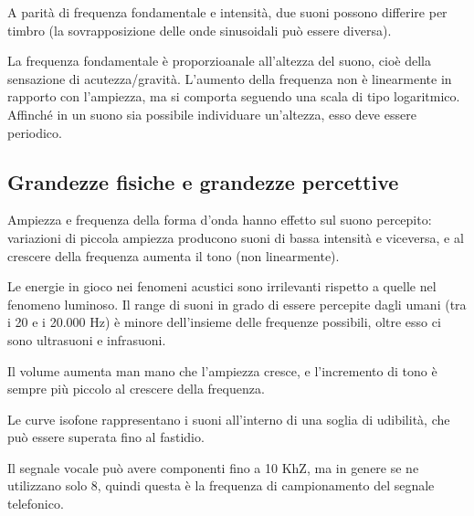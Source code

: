 A parità di frequenza fondamentale e intensità, due suoni possono differire per timbro (la sovrapposizione delle onde sinusoidali può essere diversa).

La frequenza fondamentale è proporzioanale all'altezza del suono, cioè della sensazione di acutezza/gravità. L'aumento della frequenza non è linearmente in rapporto con l'ampiezza, ma si comporta seguendo una scala di tipo logaritmico. Affinché in un suono sia possibile individuare un'altezza, esso deve essere periodico. 

\subsection{Grandezze fisiche e grandezze percettive}
Ampiezza e frequenza della forma d'onda hanno effetto sul suono percepito: variazioni di piccola ampiezza producono suoni di bassa intensità e viceversa, e al crescere della frequenza aumenta il tono (non linearmente).

Le energie in gioco nei fenomeni acustici sono irrilevanti rispetto a quelle nel fenomeno luminoso. Il range di suoni in grado di essere percepite dagli umani (tra i 20 e i 20.000 Hz) è minore dell'insieme delle frequenze possibili, oltre esso ci sono ultrasuoni e infrasuoni. 

Il volume aumenta man mano che l'ampiezza cresce, e l'incremento di tono è sempre più piccolo al crescere della frequenza.



Le curve isofone rappresentano i suoni all'interno di una soglia di udibilità, che può essere superata fino al fastidio. 

Il segnale vocale può avere componenti fino a 10 KhZ, ma in genere se ne utilizzano solo 8, quindi questa è la frequenza di campionamento del segnale telefonico. 
